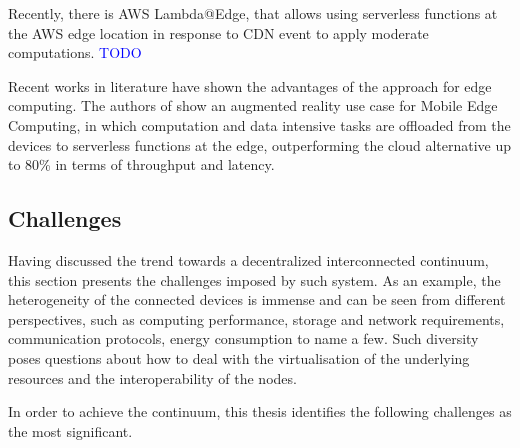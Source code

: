 \documentclass{ieeeaccess}
\begin{document}
Recently, there is AWS Lambda@Edge, that allows using serverless functions at the AWS edge location in response to CDN event to apply moderate computations. \textcolor{blue}{TODO}

Recent works in literature have shown the advantages of the approach for edge computing. The authors of \cite{serverless-mec} show an augmented reality use case for Mobile Edge Computing, in which computation and data intensive tasks are offloaded from the devices to serverless functions at the edge, outperforming the cloud alternative up to 80\% in terms of throughput and latency.

\subsection{Challenges}

Having discussed the trend towards a decentralized interconnected continuum, this section presents the challenges imposed by such system. As an example, the heterogeneity of the connected devices is immense and can be seen from different perspectives, such as computing performance, storage and network requirements, communication protocols, energy consumption to name a few. Such diversity poses questions about how to deal with the virtualisation of the underlying resources and the interoperability of the nodes.

In order to achieve the continuum, this thesis identifies the following challenges as the most significant. 
\label{challenges}
\end{document}
